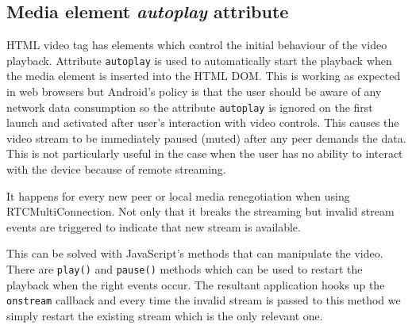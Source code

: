\subsection{Media element \textit{autoplay} attribute}
HTML video tag has elements which control the initial behaviour of the video playback. Attribute \verb!autoplay! is used to automatically start the playback  when the media element is inserted into the HTML DOM. This is working as expected in web browsers but Android's policy is that the user should be aware of any network data consumption so the attribute \verb!autoplay! is ignored on the first launch and activated after user's interaction with video controls. This causes the video stream to be immediately paused (muted) after any peer demands the data. This is not particularly useful in the case when the user has no ability to interact with the device because of remote streaming.

It happens for every new peer or local media renegotiation when using RTCMultiConnection. Not only that it breaks the streaming but invalid stream events are triggered to indicate that new stream is available. 

This can be solved with JavaScript's methods that can manipulate the video. There are \verb!play()! and \verb!pause()! methods which can be used to restart the playback when the right events occur. The resultant application hooks up the \verb!onstream! callback and every time the invalid stream is passed to this method we simply restart the existing stream which is the only relevant one.


